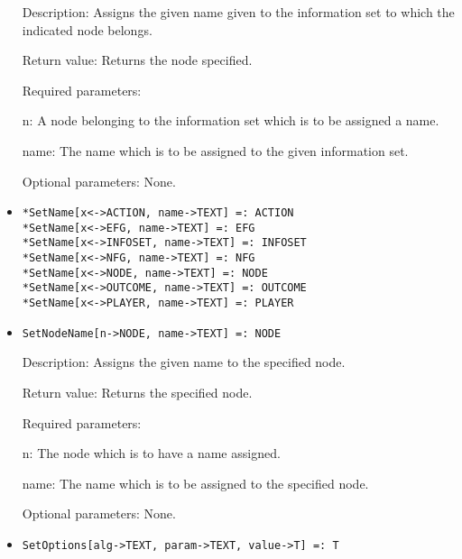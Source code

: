 \begin{itemize}
\bd
\item
[Description:] Assigns the given name given to the information set to
which the indicated node belongs.
\item
[Return value:] Returns the node specified.
\item
[Required parameters:]\hfil\null
	
\bd
\item
[n:] A node belonging to the information set which is to be assigned a
name.
\item
[name:] The name which is to be assigned to the given information set.
\ed

\item
[Optional parameters:] None.
\ed

\item
\protect \large \begin{verbatim}
*SetName[x<->ACTION, name->TEXT] =: ACTION
*SetName[x<->EFG, name->TEXT] =: EFG
*SetName[x<->INFOSET, name->TEXT] =: INFOSET
*SetName[x<->NFG, name->TEXT] =: NFG
*SetName[x<->NODE, name->TEXT] =: NODE
*SetName[x<->OUTCOME, name->TEXT] =: OUTCOME
*SetName[x<->PLAYER, name->TEXT] =: PLAYER
\end{verbatim}\normalsize

\item

\protect \large \begin{verbatim}
SetNodeName[n->NODE, name->TEXT] =: NODE
\end{verbatim}\normalsize

\bd
\item
[Description:] Assigns the given name to the specified node.
\item
[Return value:] Returns the specified node.
\item
[Required parameters:]\hfil\null
	
\bd
\item
[n:] The node which is to have a name assigned.
\item
[name:] The name which is to be assigned to the specified node.
\ed

\item
[Optional parameters:] None.
\ed

\item
\protect \large \begin{verbatim}
SetOptions[alg->TEXT, param->TEXT, value->T] =: T
\end{verbatim}\normalsize




\end{itemize}
